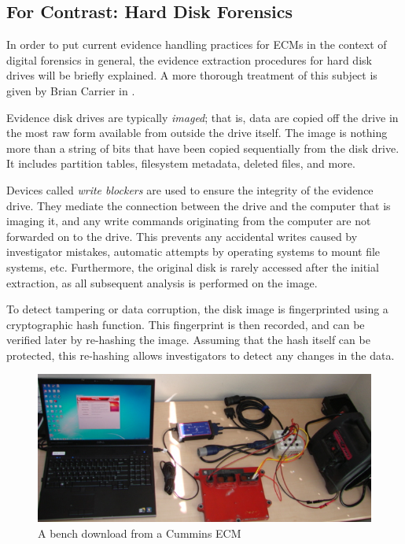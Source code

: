 \subsection{For Contrast: Hard Disk Forensics}

In order to put current evidence handling practices for ECMs in the context of digital forensics in general, the evidence extraction
procedures for hard disk drives will be briefly explained. A more thorough treatment of this subject is given by Brian Carrier in \cite{carrier2005}.

Evidence disk drives are typically \emph{imaged}; that is, data are copied off the drive in the most raw form available from outside
the drive itself. The image is nothing more than a string of bits that have been copied sequentially from the disk drive. It includes
partition tables, filesystem metadata, deleted files, and more.

Devices called \emph{write blockers} are used to ensure the integrity of the evidence drive\cite{carrier2005}. They mediate the connection between the
drive and the computer that is imaging it, and any write commands originating from the computer are not forwarded on to the drive.
This prevents any accidental writes caused by investigator mistakes, automatic attempts by operating systems to mount file systems, etc.
Furthermore, the original disk is rarely accessed after the initial extraction, as all subsequent analysis is performed on the image.

To detect tampering or data corruption, the disk image is fingerprinted using a cryptographic hash function. This fingerprint is then recorded,
and can be verified later by re-hashing the image. Assuming that the hash itself can be protected, this re-hashing allows investigators to
detect any changes in the data.

\begin{figure}[h]
  \center
  \includegraphics[scale=0.5]{cumminsbench}
  \caption{A bench download from a Cummins ECM}
  \label{fig:cumminsbench}
\end{figure}

